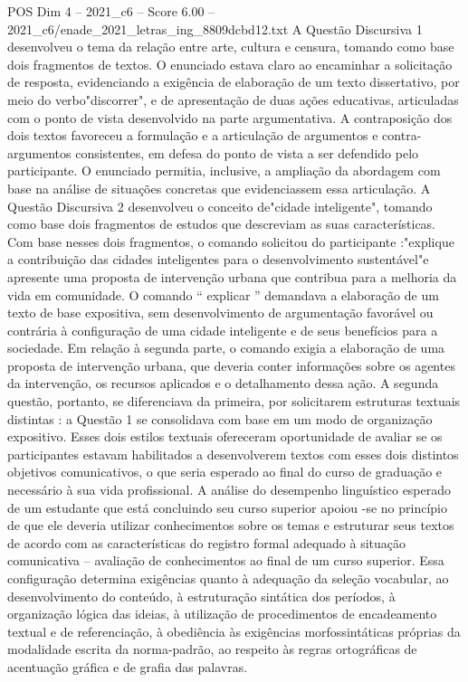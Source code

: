 \begin{textsample}{POS Dim 4 – 2021\_c6 – Score 6.00 – 2021\_c6/enade\_2021\_letras\_ing\_8809dcbd12.txt}
A Questão Discursiva 1 desenvolveu o tema da relação entre arte, cultura e censura, tomando como base dois fragmentos de textos.
O enunciado estava claro ao encaminhar a solicitação de resposta, evidenciando a exigência de elaboração de um texto dissertativo, por meio do verbo"discorrer", e de apresentação de duas ações educativas, articuladas com o ponto de vista desenvolvido na parte argumentativa.
A contraposição dos dois textos favoreceu a formulação e a articulação de argumentos e contra-argumentos consistentes, em defesa do ponto de vista a ser defendido pelo participante.
O enunciado permitia, inclusive, a ampliação da abordagem com base na análise de situações concretas que evidenciassem essa articulação.
A Questão Discursiva 2 desenvolveu o conceito de"cidade inteligente", tomando como base dois fragmentos de estudos que descreviam as suas características.
Com base nesses dois fragmentos, o comando solicitou do participante :"explique a contribuição das cidades inteligentes para o desenvolvimento sustentável"e apresente uma proposta de intervenção urbana que contribua para a melhoria da vida em comunidade.
O comando “ explicar ” demandava a elaboração de um texto de base expositiva, sem desenvolvimento de argumentação favorável ou contrária à configuração de uma cidade inteligente e de seus benefícios para a sociedade.
Em relação à segunda parte, o comando exigia a elaboração de uma proposta de intervenção urbana, que deveria conter informações sobre os agentes da intervenção, os recursos aplicados e o detalhamento dessa ação.
A segunda questão, portanto, se diferenciava da primeira, por solicitarem estruturas textuais distintas : a Questão 1 se consolidava com base em um modo de organização expositivo.
Esses dois estilos textuais ofereceram oportunidade de avaliar se os participantes estavam habilitados a desenvolverem textos com esses dois distintos objetivos comunicativos, o que seria esperado ao final do curso de graduação e necessário à sua vida profissional.
A análise do desempenho linguístico esperado de um estudante que está concluindo seu curso superior apoiou -se no princípio de que ele deveria utilizar conhecimentos sobre os temas e estruturar seus textos de acordo com as características do registro formal adequado à situação comunicativa – avaliação de conhecimentos ao final de um curso superior.
Essa configuração determina exigências quanto à adequação da seleção vocabular, ao desenvolvimento do conteúdo, à estruturação sintática dos períodos, à organização lógica das ideias, à utilização de procedimentos de encadeamento textual e de referenciação, à obediência às exigências morfossintáticas próprias da modalidade escrita da norma-padrão, ao respeito às regras ortográficas de acentuação gráfica e de grafia das palavras.

\end{textsample}

